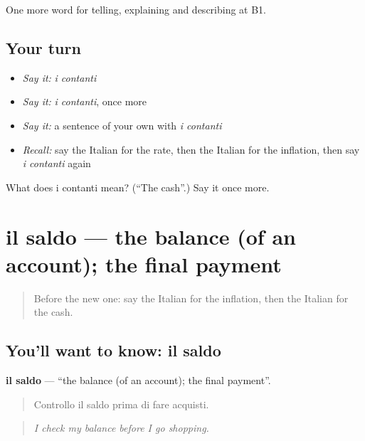 \begin{grammarlens}[title={What you've built}]
One more word for telling, explaining and describing at B1.
\end{grammarlens}

\subsection*{Your turn}
\begin{itemize}
\raggedright
  \item \emph{Say it:} \emph{i contanti}
  \item \emph{Say it:} \emph{i contanti}, once more
  \item \emph{Say it:} a sentence of your own with \emph{i contanti}
  \item \emph{Recall:} say the Italian for the rate, then the Italian for the inflation, then say \emph{i contanti} again
\end{itemize}

\begin{tcolorbox}[breakable,colback=teal!4,colframe=teal!35!black,title={Before you move on}]
What does i contanti mean? (\textquotedblleft{}The cash\textquotedblright{}.) Say it once more.
\end{tcolorbox}
\section[il saldo]{il saldo — the balance (of an account); the final payment}

\label{lesson:IT-C396-saldo}



\begin{quote}
Before the new one: say the Italian for the inflation, then the Italian for the cash.
\end{quote}

\subsection*{You'll want to know: il saldo}
\textbf{il saldo} — \textquotedblleft{}the balance (of an account); the final payment\textquotedblright{}.

\begin{quote}
Controllo il saldo prima di fare acquisti.
\end{quote}

\begin{quote}
\emph{I check my balance before I go shopping.}
\end{quote}

